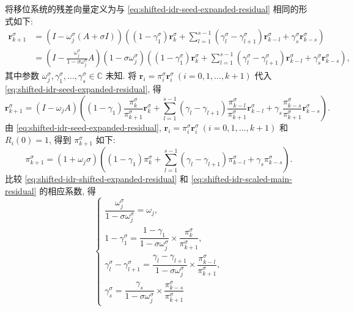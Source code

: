 {将移位系统的残差向量定义为与 \eqref{eq:shifted-idr-seed-expanded-residual} 相同的形式如下:}
\begin{equation}\label{eq:shifted-idr-shifted-expanded-residual}\begin{aligned}\bm r_{k+1}^{\sigma}&=(I-\omega_j^{\sigma}(A+\sigma I))\left((1-\gamma_1^{\sigma})\bm r_k^{\sigma}+\sum_{l=1}^{s-1}(\gamma_l^{\sigma}-\gamma_{l+1}^{\sigma})\bm r_{k-l}^{\sigma}+\gamma_s^{\sigma}\bm r_{k-s}^{\sigma}\right)\\
&=\left(I-\frac{\omega_j^{\sigma}}{1-\sigma\omega_j^{\sigma}}A\right)(1-\sigma\omega_j^{\sigma})\left((1-\gamma_1^{\sigma})\bm r_k^{\sigma}+\sum_{l=1}^{s-1}(\gamma_l^{\sigma}-\gamma_{l+1}^{\sigma})\bm r_{k-l}^{\sigma}+\gamma_s^{\sigma}\bm r_{k-s}^{\sigma}\right),\end{aligned}\end{equation}
{其中参数 $\omega_j^{\sigma},\gamma_1^{\sigma},\ldots,\gamma_s^{\sigma}\in\mathbb C$ 未知. 将 $\bm r_i=\pi_i^{\sigma}\bm r_i^{\sigma}\ (i=0,1,\ldots,k+1)$ 代入 \eqref{eq:shifted-idr-seed-expanded-residual}, 得}
\begin{equation}\label{eq:shifted-idr-scaled-main-residual}\bm r_{k+1}^{\sigma}=(I-\omega_jA)\left((1-\gamma_1)\frac{\pi_k^{\sigma}}{\pi_{k+1}^{\sigma}}\bm r_k^{\sigma}+\sum_{l=1}^{s-1}(\gamma_l-\gamma_{l+1})\frac{\pi_{k-l}^{\sigma}}{\pi_{k+1}^{\sigma}}\bm r_{k-l}^{\sigma}+\gamma_s\frac{\pi_{k-s}^{\sigma}}{\pi_{k+1}^{\sigma}}\bm r_{k-s}^{\sigma}\right).\end{equation}
{由 \eqref{eq:shifted-idr-seed-expanded-residual}, $\bm r_i=\pi_i^{\sigma}\bm r_i^{\sigma}\ (i=0,1,\ldots,k+1)$ 和 $R_i(0)=1$, 得到 $\pi_{k+1}^{\sigma}$ 如下:}
\begin{equation}\label{eq:shifted-idr-main-pi}\pi_{k+1}^{\sigma}=(1+\omega_j\sigma)\left((1-\gamma_1)\pi_k^{\sigma}+\sum_{l=1}^{s-1}(\gamma_l-\gamma_{l+1})\pi_{k-l}^{\sigma}+\gamma_s\pi_{k-s}^{\sigma}\right).\end{equation}
{比较 \eqref{eq:shifted-idr-shifted-expanded-residual} 和 \eqref{eq:shifted-idr-scaled-main-residual} 的相应系数, 得}
\begin{equation}\label{eq:shifted-idr-coefficient-matching}\begin{cases}\dfrac{\omega_j^{\sigma}}{1-\sigma\omega_j^{\sigma}}=\omega_j,\\
1-\gamma_1^{\sigma}=\dfrac{1-\gamma_1}{1-\sigma\omega_j^{\sigma}}\times\dfrac{\pi_k^{\sigma}}{\pi_{k+1}^{\sigma}},\\
\gamma_l^{\sigma}-\gamma_{l+1}^{\sigma}=\dfrac{\gamma_l-\gamma_{l+1}}{1-\sigma\omega_j^{\sigma}}\times\dfrac{\pi_{k-l}^{\sigma}}{\pi_{k+1}^{\sigma}},\\
\gamma_s^{\sigma}=\dfrac{\gamma_s}{1-\sigma\omega_j^{\sigma}}\times\dfrac{\pi_{k-s}^{\sigma}}{\pi_{k+1}^{\sigma}}\end{cases}\end{equation}

